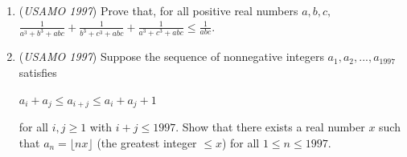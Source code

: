 \begin{enumerate}
 

	\item (\textit{USAMO 1997}) Prove that, for all positive real numbers $a, b, c,$
$\frac{1}{a^3+b^3+abc}+\frac{1}{b^3+c^3+abc}+\frac{1}{a^3+c^3+abc} \le \frac{1}{abc}$.


 

	\item (\textit{USAMO 1997}) Suppose the sequence of nonnegative integers $a_1,a_2,...,a_{1997}$ satisfies 


 $a_i+a_j \le a_{i+j} \le a_i+a_j+1$


 for all $i, j \ge 1$ with $i+j \le 1997$. Show that there exists a real number $x$ such that $a_n=\lfloor{nx}\rfloor$ (the greatest integer $\le x$) for all $1 \le n \le 1997$.


 

\end{enumerate}
